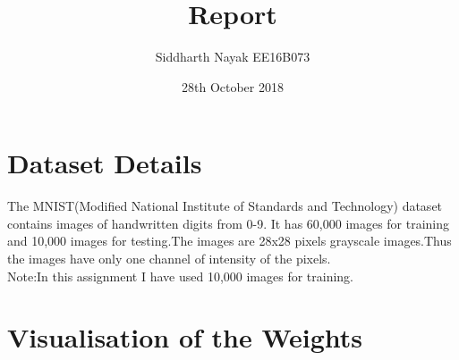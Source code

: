 \documentclass{article}
\title{Report}
\date{28th October 2018}
\author{Siddharth Nayak EE16B073 }
\begin{document}
\maketitle
\newcommand{\norm}[1]{\left\lVert#1\right\rVert}


\section{Dataset Details}
The MNIST(Modified National Institute of Standards and Technology) dataset contains images of handwritten digits from 0-9. It has 60,000 images for training and 10,000 images for testing.The images are 28x28 pixels grayscale images.Thus the images have only one channel of intensity of the pixels.\\ Note:In this assignment I have used 10,000 images for training.

\section{Visualisation of the Weights}
\begin{figure}[H]
\hspace{0.05\textwidth}
\end{figure}
\end{document}
